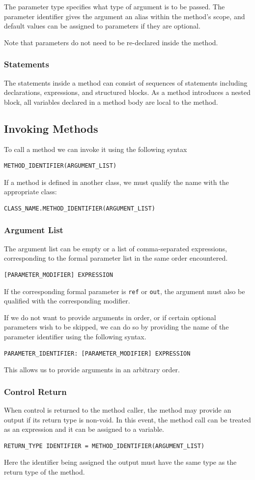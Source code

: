 \documentclass{article}
\begin{document}
The parameter type specifies what type of argument is to be passed. The parameter identifier
gives the argument an alias within the method's scope, and
default values can be assigned to parameters if they are optional.

Note that parameters do not need to be re-declared inside the method.
\subsubsection{Statements}
The statements inside a method can consist of sequences of statements
including declarations, expressions, and structured blocks.
As a method introduces a nested block, all variables declared in a method body
are local to the method.
\subsection{Invoking Methods}
To call a method we can invoke it using the following syntax
\begin{lstlisting}[numbers=none]
METHOD_IDENTIFIER(ARGUMENT_LIST)
\end{lstlisting}
If a method is defined in another class, we must qualify the name
with the appropriate class:
\begin{lstlisting}[numbers=none]
CLASS_NAME.METHOD_IDENTIFIER(ARGUMENT_LIST)
\end{lstlisting}
\subsubsection{Argument List}
The argument list can be empty or a list of comma-separated expressions,
corresponding to the formal parameter list in the same order encountered.
\begin{lstlisting}[numbers=none]
[PARAMETER_MODIFIER] EXPRESSION
\end{lstlisting}
If the corresponding formal parameter is \lstinline{ref} or \lstinline{out},
the argument must also be qualified with the corresponding modifier.

If we do not want to provide arguments in order, or if certain
optional parameters wish to be skipped, we can do so by
providing the name of the parameter identifier using the following syntax.
\begin{lstlisting}[numbers=none]
PARAMETER_IDENTIFIER: [PARAMETER_MODIFIER] EXPRESSION
\end{lstlisting}
This allows us to provide arguments in an arbitrary order.
\subsubsection{Control Return}
When control is returned to the method caller, the method
may provide an output if its return type is non-void.
In this event, the method call can be treated as an expression
and it can be assigned to a variable.
\begin{lstlisting}[numbers=none]
RETURN_TYPE IDENTIFIER = METHOD_IDENTIFIER(ARGUMENT_LIST)
\end{lstlisting}
Here the identifier being assigned the output must have the same
type as the return type of the method.
\end{document}
